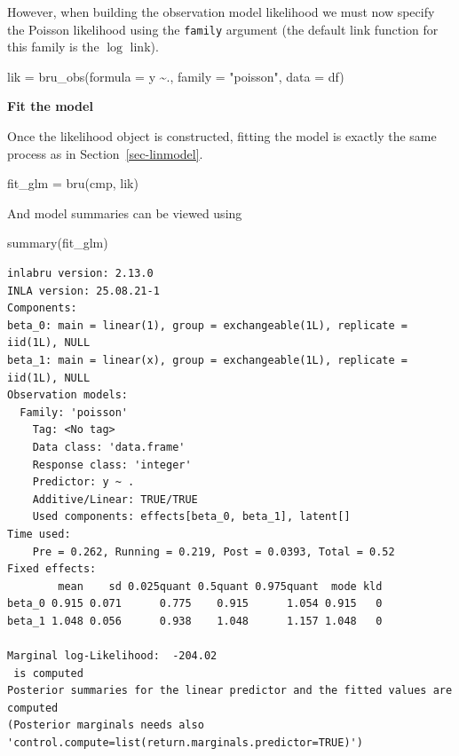 \documentclass[
  letterpaper,
  DIV=11,
  numbers=noendperiod]{scrartcl}
\newenvironment{Shaded}{\begin{snugshade}}{\end{snugshade}}
\newcommand{\AttributeTok}[1]{\textcolor[rgb]{0.40,0.45,0.13}{#1}}
\newcommand{\FunctionTok}[1]{\textcolor[rgb]{0.28,0.35,0.67}{#1}}
\newcommand{\NormalTok}[1]{\textcolor[rgb]{0.00,0.23,0.31}{#1}}
\newcommand{\OtherTok}[1]{\textcolor[rgb]{0.00,0.23,0.31}{#1}}
\newcommand{\SpecialCharTok}[1]{\textcolor[rgb]{0.37,0.37,0.37}{#1}}
\newcommand{\StringTok}[1]{\textcolor[rgb]{0.13,0.47,0.30}{#1}}
\begin{document}
However, when building the observation model likelihood we must now
specify the Poisson likelihood using the \texttt{family} argument (the
default link function for this family is the \(\log\) link).

\begin{Shaded}
\begin{Highlighting}[]
\NormalTok{lik }\OtherTok{=}  \FunctionTok{bru\_obs}\NormalTok{(}\AttributeTok{formula =}\NormalTok{ y }\SpecialCharTok{\textasciitilde{}}\NormalTok{.,}
            \AttributeTok{family =} \StringTok{"poisson"}\NormalTok{,}
            \AttributeTok{data =}\NormalTok{ df)}
\end{Highlighting}
\end{Shaded}

\textbf{Fit the model}

Once the likelihood object is constructed, fitting the model is exactly
the same process as in Section~\ref{sec-linmodel}.

\begin{Shaded}
\begin{Highlighting}[]
\NormalTok{fit\_glm }\OtherTok{=} \FunctionTok{bru}\NormalTok{(cmp, lik)}
\end{Highlighting}
\end{Shaded}

And model summaries can be viewed using

\begin{Shaded}
\begin{Highlighting}[]
\FunctionTok{summary}\NormalTok{(fit\_glm)}
\end{Highlighting}
\end{Shaded}

\begin{verbatim}
inlabru version: 2.13.0
INLA version: 25.08.21-1
Components:
beta_0: main = linear(1), group = exchangeable(1L), replicate = iid(1L), NULL
beta_1: main = linear(x), group = exchangeable(1L), replicate = iid(1L), NULL
Observation models:
  Family: 'poisson'
    Tag: <No tag>
    Data class: 'data.frame'
    Response class: 'integer'
    Predictor: y ~ .
    Additive/Linear: TRUE/TRUE
    Used components: effects[beta_0, beta_1], latent[]
Time used:
    Pre = 0.262, Running = 0.219, Post = 0.0393, Total = 0.52 
Fixed effects:
        mean    sd 0.025quant 0.5quant 0.975quant  mode kld
beta_0 0.915 0.071      0.775    0.915      1.054 0.915   0
beta_1 1.048 0.056      0.938    1.048      1.157 1.048   0

Marginal log-Likelihood:  -204.02 
 is computed 
Posterior summaries for the linear predictor and the fitted values are computed
(Posterior marginals needs also 'control.compute=list(return.marginals.predictor=TRUE)')
\end{verbatim}
\end{document}

